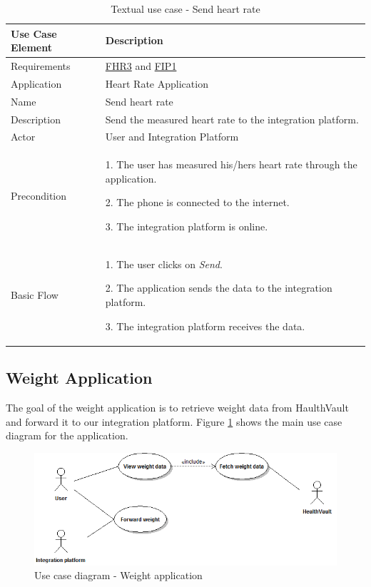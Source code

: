 \begin{table}[H]
\begin{center}
\begin{tabular}{ l | p{10cm} }
  \hline
  \textbf{Use Case Element} & \textbf{Description} \\ \hline\hline
  Requirements & \hyperref[table:reqheartrate]{FHR3} and \hyperref[table:reqip]{FIP1} \\ \hline
  Application & Heart Rate Application \\ \hline
  Name & Send heart rate \\ \hline
  Description & Send the measured heart rate to the integration platform. \\ \hline
  Actor & User and Integration Platform \\ \hline
  Precondition &
    \par 1. The user has measured his/hers heart rate through the application.
    \par 2. The phone is connected to the internet.
    \par 3. The integration platform is online.
  \\ \hline
  Basic Flow & 
  	\par 1. The user clicks on \textit{Send}.
  	\par 2. The application sends the data to the integration platform.
  	\par 3. The integration platform receives the data.
  \\ \hline
\end{tabular}
\end{center}
\caption{Textual use case - Send heart rate}
\label{table:use-case-send-heart-rate}
\end{table}

\subsection{Weight Application}

The goal of the weight application is to retrieve weight data from HaulthVault and forward it to our integration platform.
Figure \ref{figure:use-case-diagram-weight} shows the main use case diagram for the application.

\begin{figure}[H]
\centering
\includegraphics[scale=0.6]{../Figures/use-case-diagram-weight.png}
\caption{Use case diagram - Weight application}
\label{figure:use-case-diagram-weight}
\end{figure}

